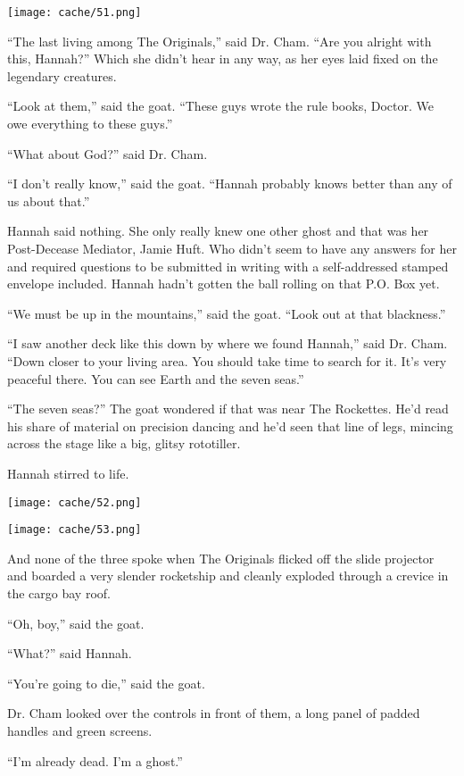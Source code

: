 \documentclass[12pt,twoside]{report}
\begin{document}
	\texttt{[image: cache/51.png]}

``The last living among The Originals,'' said Dr. Cham.  ``Are you
        alright with this, Hannah?''  Which she didn't hear in any
        way, as her eyes laid fixed on the legendary creatures.

``Look at them,'' said the goat.  ``These guys wrote the rule books,
        Doctor.  We owe everything to these guys.''

``What about God?'' said Dr. Cham.

``I don't really know,'' said the goat.  ``Hannah probably knows
        better than any of us about that.''

Hannah said nothing.  She only really knew one other ghost and that
was her Post-Decease Mediator, Jamie Huft.  Who didn't seem to have
any answers for her and required questions to be submitted in writing
with a self-addressed stamped envelope included.  Hannah hadn't gotten
the ball rolling on that P.O. Box yet.

``We must be up in the mountains,'' said the goat.  ``Look out at that
blackness.''

``I saw another deck like this down by where we found Hannah,'' said
Dr. Cham.  ``Down closer to your living area.  You should take time to
search for it.  It's very peaceful there. You can see Earth and the
seven seas.''

``The seven seas?''  The goat wondered if that was near The Rockettes.
He'd read his share of material on precision dancing and he'd seen
that line of legs, mincing across the stage like a big, glitsy
rototiller.

Hannah stirred to life.

	\texttt{[image: cache/52.png]}

	\texttt{[image: cache/53.png]}

And none of the three spoke when The Originals flicked off the slide
projector and boarded a very slender rocketship and cleanly exploded
through a crevice in the cargo bay roof.

``Oh, boy,'' said the goat.

``What?'' said Hannah.

``You're going to die,'' said the goat.

Dr. Cham looked over the controls in front of them, a long panel of
padded handles and green screens.

``I'm already dead.  I'm a ghost.''
\end{document}
